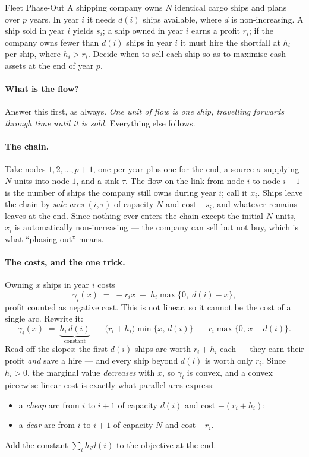 \begin{probdef}{Fleet Phase-Out}
  \instance A shipping company owns $N$ identical cargo ships and plans over
  $p$ years. In year $i$ it needs $d(i)$ ships available, where $d$ is
  non-increasing. A ship sold in year $i$ yields $s_i$; a ship owned in year
  $i$ earns a profit $r_i$; if the company owns fewer than $d(i)$ ships in year
  $i$ it must hire the shortfall at $h_i$ per ship, where $h_i > r_i$.
  \goal Decide when to sell each ship so as to maximise cash assets at the end
  of year $p$.
\end{probdef}

\paragraph{What is the flow?}
Answer this first, as always. \emph{One unit of flow is one ship, travelling
forwards through time until it is sold.} Everything else follows.

\paragraph{The chain.}
Take nodes $1, 2, \ldots, p+1$, one per year plus one for the end, a source
$\sigma$ supplying $N$ units into node $1$, and a sink $\tau$. The flow on the
link from node $i$ to node $i+1$ is the number of ships the company still owns
during year $i$; call it $x_i$. Ships leave the chain by \emph{sale arcs}
$(i, \tau)$ of capacity $N$ and cost $-s_i$, and whatever remains leaves at the
end. Since nothing ever enters the chain except the initial $N$ units, $x_i$ is
automatically non-increasing --- the company can sell but not buy, which is what
``phasing out'' means.

\paragraph{The costs, and the one trick.}
Owning $x$ ships in year $i$ costs
\[ \gamma_i(x) \;=\; -r_i x \;+\; h_i \max\{0,\; d(i)-x\}, \]
profit counted as negative cost. This is not linear, so it cannot be the cost of
a single arc. Rewrite it:
\[ \gamma_i(x) \;=\; \underbrace{h_i\, d(i)}_{\text{constant}}
   \;-\; \bigl(r_i + h_i\bigr)\min\{x,\, d(i)\} \;-\; r_i \max\{0,\, x - d(i)\}. \]
Read off the slopes: the first $d(i)$ ships are worth $r_i + h_i$ each --- they
earn their profit \emph{and} save a hire --- and every ship beyond $d(i)$ is
worth only $r_i$. Since $h_i > 0$, the marginal value \emph{decreases} with $x$,
so $\gamma_i$ is convex, and a convex piecewise-linear cost is exactly what
parallel arcs express:
\begin{itemize}[nosep]
  \item a \emph{cheap} arc from $i$ to $i+1$ of capacity $d(i)$ and cost
        $-(r_i + h_i)$;
  \item a \emph{dear} arc from $i$ to $i+1$ of capacity $N$ and cost $-r_i$.
\end{itemize}
Add the constant $\sum_i h_i d(i)$ to the objective at the end.

